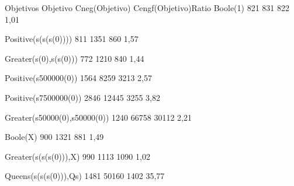 
Objetivos Objetivo Cneg(Objetivo) Cengf(Objetivo)Ratio 
Boole(1)
821
831
822
1,01

Positive(s(s(s(0))))
811
1351
860
1,57

Greater(s(0),s(s(0)))
772
1210
840
1,44

Positive(s500000(0))
1564
8259
3213
2,57

Positive(s7500000(0))
2846
12445
3255
3,82

Greater(s50000(0),s50000(0))
1240
66758
30112
2,21

Boole(X)
900
1321
881
1,49

Greater(s(s(s(0))),X)
990
1113
1090
1,02

Queens(s(s(s(0))),Qs)
1481
50160
1402
35,77

